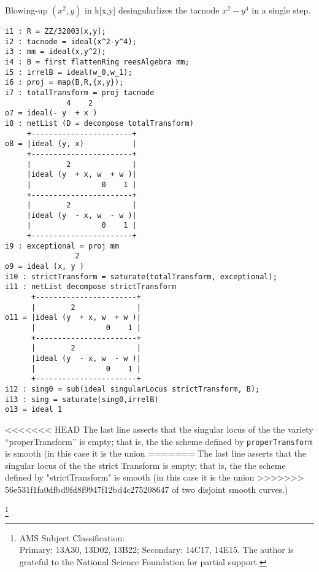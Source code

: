 \documentclass[twoside,12pt, leqno]{amsart}
\begin{document}
\begin{normalsize}
\begin{example}
Blowing-up $(x^2,y)$ in k[x,y] desingularlizes the tacnode $x^2-y^4$ in a single step. 
\end{example}
\begin{footnotesize}
 \begin{verbatim}
i1 : R = ZZ/32003[x,y];
i2 : tacnode = ideal(x^2-y^4);
i3 : mm = ideal(x,y^2);
i4 : B = first flattenRing reesAlgebra mm;
i5 : irrelB = ideal(w_0,w_1);
i6 : proj = map(B,R,{x,y});
i7 : totalTransform = proj tacnode
              4    2
o7 = ideal(- y  + x )
i8 : netList (D = decompose totalTransform)
     +-----------------------+
o8 = |ideal (y, x)           |
     +-----------------------+
     |        2              |
     |ideal (y  + x, w  + w )|
     |                0    1 |
     +-----------------------+
     |        2              |
     |ideal (y  - x, w  - w )|
     |                0    1 |
     +-----------------------+
i9 : exceptional = proj mm
                2
o9 = ideal (x, y )
i10 : strictTransform = saturate(totalTransform, exceptional);
i11 : netList decompose strictTransform
      +-----------------------+
      |        2              |
o11 = |ideal (y  + x, w  + w )|
      |                0    1 |
      +-----------------------+
      |        2              |
      |ideal (y  - x, w  - w )|
      |                0    1 |
      +-----------------------+
i12 : sing0 = sub(ideal singularLocus strictTransform, B);
i13 : sing = saturate(sing0,irrelB)
o13 = ideal 1
\end{verbatim}
\end{footnotesize}
<<<<<<< HEAD
The last line asserts that the singular locus of the the variety ``properTransform'' is empty;
that is, the the scheme defined by {\tt properTransform} is smooth (in this case it is the union
=======
The last line asserts that the singular locus of the the strict Transform is empty;
that is, the the scheme defined by "strictTransform" is smooth (in this case it is the union
>>>>>>> 56e531f1fa0dfbd9fd8f9947f12bd4c275208647
of two disjoint smooth curves.)

\let\thefootnote\relax\footnote{
\noindent AMS Subject Classification:\\
Primary: 13A30, 13D02, 13B22;
Secondary: 14C17, 14E15.\smallbreak
The author is grateful to the
National Science Foundation for partial support.}

\begin{thebibliography}{ABC99}


\end{thebibliography}
\end{normalsize}
\end{document}
